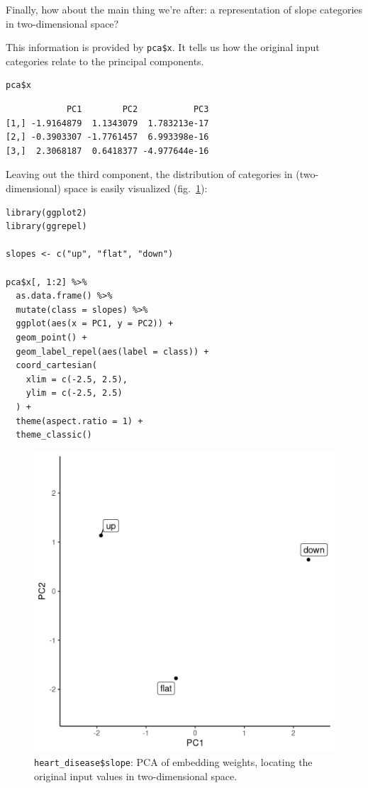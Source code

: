 \documentclass[
  letterpaper,
]{krantz}
\begin{document}
Finally, how about the main thing we're after: a representation of slope
categories in two-dimensional space?

This information is provided by \texttt{pca\$x}. It tells us how the
original input categories relate to the principal components.

\begin{verbatim}
pca$x
\end{verbatim}

\begin{verbatim}
            PC1        PC2           PC3
[1,] -1.9164879  1.1343079  1.783213e-17
[2,] -0.3903307 -1.7761457  6.993398e-16
[3,]  2.3068187  0.6418377 -4.977644e-16
\end{verbatim}

Leaving out the third component, the distribution of categories in
(two-dimensional) space is easily visualized
(fig.~\ref{fig-tabular-heart-disease-pca}):

\begin{verbatim}
library(ggplot2)
library(ggrepel)

slopes <- c("up", "flat", "down")

pca$x[, 1:2] %>%
  as.data.frame() %>%
  mutate(class = slopes) %>%
  ggplot(aes(x = PC1, y = PC2)) +
  geom_point() +
  geom_label_repel(aes(label = class)) +
  coord_cartesian(
    xlim = c(-2.5, 2.5),
    ylim = c(-2.5, 2.5)
  ) +
  theme(aspect.ratio = 1) +
  theme_classic()
\end{verbatim}

\begin{figure}[H]

{\centering \includegraphics{images/tabular-heart-disease-pca.png}

}

\caption{\label{fig-tabular-heart-disease-pca}\texttt{heart\_disease\$slope}:
PCA of embedding weights, locating the original input values in
two-dimensional space.}

\end{figure}
\end{document}
